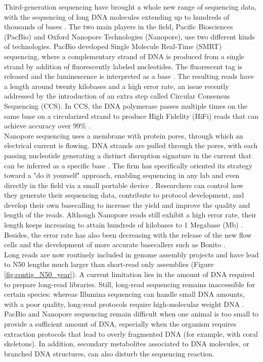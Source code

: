 Third-generation sequencing have brought a whole new range of sequencing data, with the sequencing of long DNA molecules extending up to hundreds of thousands of bases \cite{pollard2018}. The two main players in the field,  Pacific Biosciences (PacBio) and Oxford Nanopore Technologies (Nanopore), use two different kinds of technologies. PacBio developed Single Molecule Real-Time (SMRT) sequencing, where a complementary strand of DNA is produced from a single strand by addition of fluorescently labeled nucleotides. The fluorescent tag is released and the luminescence is interpreted as a base \cite{pacbio_smrt}. The resulting reads have a length around twenty kilobases and a high error rate, an issue recently addressed by the introduction of an extra step called Circular Consensus Sequencing (CCS). In CCS, the DNA polymerase passes multiple times on the same base on a circularized strand to produce High Fidelity (HiFi) reads that can achieve accuracy over 99\% \cite{pacbio_ccs}. \\

Nanopore sequencing uses a membrane with protein pores, through which an electrical current is flowing. DNA strands are pulled through the pores, with each passing nucleotide generating a distinct disruption signature in the current that can be inferred as a specific base \cite{nanopore}. The firm has specifically oriented its strategy toward a "do it yourself" approach, enabling sequencing in any lab and even directly in the field via a small portable device \cite{minion}. Researchers can control how they generate their sequencing data, contribute to protocol development, and develop their own basecalling \cite{basecallers} to increase the yield and improve the quality and length of the reads. Although Nanopore reads still exhibit a high error rate, their length keeps increasing to attain hundreds of kilobases to 1 Megabase (Mb) \cite{Jain2018}. Besides, the error rate has also been decreasing with the release of the new flow cells and the development of more accurate basecallers such as Bonito \cite{bonito}. \\

Long reads are now routinely included in genome assembly projects and have lead to N50 lengths much larger than short-read only assemblies (Figure \ref{fig:contig_N50_year}). A current limitation lies in the amount of DNA required to prepare long-read libraries. Still, long-read sequencing remains inaccessible for certain species: whereas Illumina sequencing can handle small DNA amounts, with a poor quality, long-read protocols require high-molecular weight DNA \cite{dna-extraction}. PacBio and Nanopore sequencing remain difficult when one animal is too small to provide a sufficient amount of DNA, especially when the organism requires extraction protocols that lead to overly fragmented DNA (for example, with coral skeletons). In addition, secondary metabolites associated to DNA molecules, or branched DNA structures, can also disturb the sequencing reaction. \\

